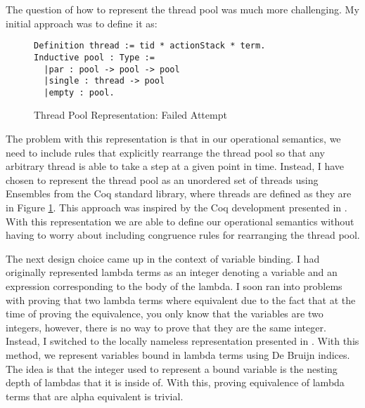 \documentclass[11pt]{article}
\begin{document}
The question of how to represent the thread pool was much more challenging.  My initial approach was to define it as:
\begin{figure}[H]
\begin{lstlisting}[morekeywords={Inductive, Type, forall, Definition}, keywordstyle=\color{blue}]
Definition thread := tid * actionStack * term.
Inductive pool : Type :=
  |par : pool -> pool -> pool
  |single : thread -> pool
  |empty : pool.
\end{lstlisting}
\caption{Thread Pool Representation: Failed Attempt}
\label{pool}
\end{figure}
The problem with this representation is that in our operational semantics, we need to include rules that explicitly rearrange the thread pool so that any arbitrary thread is able to take a step at a given point in time.  Instead, I have chosen to represent the thread pool as an unordered set of threads using Ensembles from the Coq standard library, where threads are defined as they are in Figure \ref{pool}.  This approach was inspired by the Coq development presented in \cite{te-ml}.  With this representation we are able to define our operational semantics without having to worry about including congruence rules for rearranging the thread pool.  

The next design choice came up in the context of variable binding.  I had originally represented lambda terms as an integer denoting a variable and an expression corresponding to the body of the lambda.  I soon ran into problems with proving that two lambda terms where equivalent due to the fact that at the time of proving the equivalence, you only know that the variables are two integers, however, there is no way to prove that they are the same integer.  Instead, I switched to the locally nameless representation presented in \cite{eng-formal-metatheory}.  With this method, we represent variables bound in lambda terms using De Bruijn indices.  The idea is that the integer used to represent a bound variable is the nesting depth of lambdas that it is inside of.  With this, proving equivalence of lambda terms that are alpha equivalent is trivial.  
\end{document}
